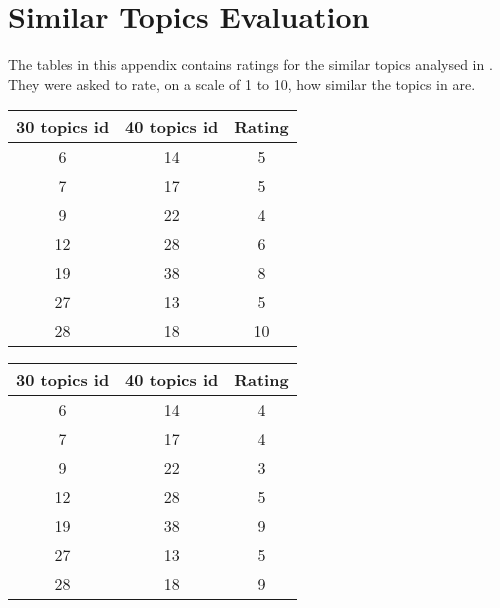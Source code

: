 \chapter{Similar Topics Evaluation}
\label{cha:similar_topics_evaluation}
The tables in this appendix contains ratings for the similar topics analysed in
. They were asked to rate, on a scale of 1 to 10, how
similar the topics in  are.


\begin{table}[H]
  \begin{subtable}{.5\linewidth}
    \centering
    \begin{tabular}{c c c} \toprule
      30 topics id & 40 topics id & Rating  \\ \midrule
          6        &    14        &  5 \\ \midrule
          7        &    17        &  5 \\ \midrule
          9        &    22        &  4 \\ \midrule
          12       &    28        &  6 \\ \midrule
          19       &    38        &  8 \\ \midrule
          27       &    13        &  5 \\ \midrule
          28       &    18        &  10 \\ \bottomrule
    \end{tabular}
  \end{subtable}
  \begin{subtable}{.5\linewidth}
    \centering
    \begin{tabular}{c c c} \toprule
      30 topics id & 40 topics id & Rating  \\ \midrule
          6        &    14        &  4 \\ \midrule
          7        &    17        &  4 \\ \midrule
          9        &    22        &  3 \\ \midrule
          12       &    28        &  5 \\ \midrule
          19       &    38        &  9 \\ \midrule
          27       &    13        &  5 \\ \midrule
          28       &    18        &  9 \\ \bottomrule
    \end{tabular}
  \end{subtable}
\end{table}


